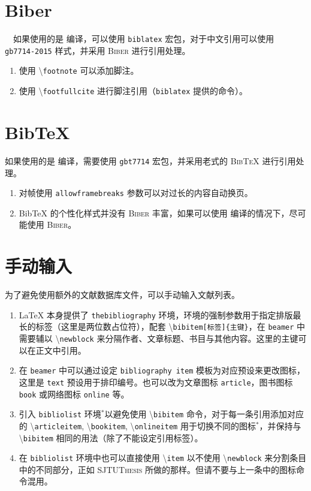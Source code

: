 \documentclass[
    UTF8,
    heading=true,
    12pt,
    a4paper
]{ctexrep}
\newenvironment{commentlist}{\begin{enumerate}\small}{\end{enumerate}}
\newcommand{\cmd}[1]{\textbackslash{}\texttt{#1}}
\begin{document}
\section{Biber}

\faApple\ \faLinux\ 如果使用的是  编译，可以使用 \texttt{biblatex} 宏包，对于中文引用可以使用 \texttt{gb7714-2015} 样式，并采用 \textsc{Biber} 进行引用处理。


\begin{commentlist}
  \item 使用 \cmd{footnote} 可以添加脚注。
  \item 使用 \cmd{footfullcite} 进行脚注引用（\texttt{biblatex} 提供的命令）。
\end{commentlist}

\section{Bib\TeX{}}

\faWindows 如果使用的是  编译，需要使用 \texttt{gbt7714} 宏包，并采用老式的 \textsc{Bib\TeX{}} 进行引用处理。


\begin{commentlist}
  \item 对帧使用 \verb"allowframebreaks" 参数可以对过长的内容自动换页。
  \item Bib\TeX{} 的个性化样式并没有 \textsc{Biber} 丰富，如果可以使用  编译的情况下，尽可能使用 \textsc{Biber}。
\end{commentlist}

\section{手动输入}

为了避免使用额外的文献数据库文件，可以手动输入文献列表。


\begin{commentlist}
  \item \LaTeX{} 本身提供了 \texttt{thebibliography} 环境，环境的强制参数用于指定排版最长的标签（这里是两位数占位符），配套 \cmd{bibitem[标签]\{主键\}}，在 \texttt{beamer} 中需要辅以 \cmd{newblock} 来分隔作者、文章标题、书目与其他内容。这里的主键可以在正文中引用。
  \item 在 \texttt{beamer} 中可以通过设定 \texttt{bibliography item} 模板为对应预设来更改图标，这里是 \texttt{text} 预设用于排印编号。也可以改为文章图标 \texttt{article}，图书图标 \texttt{book} 或网络图标 \texttt{online} 等。
  \item 引入 \texttt{bibliolist} 环境$^*$以避免使用 \cmd{bibitem} 命令，对于每一条引用添加对应的 \cmd{articleitem}, \cmd{bookitem}, \cmd{onlineitem} 用于切换不同的图标$^*$，并保持与 \cmd{bibitem} 相同的用法（除了不能设定引用标签）。
  \item 在 \texttt{bibliolist} 环境中也可以直接使用 \cmd{item} 以不使用 \cmd{newblock} 来分割条目中的不同部分，正如 \textsc{SJTUThesis} 所做的那样。但请不要与上一条中的图标命令混用。
\end{commentlist}
\end{document}
